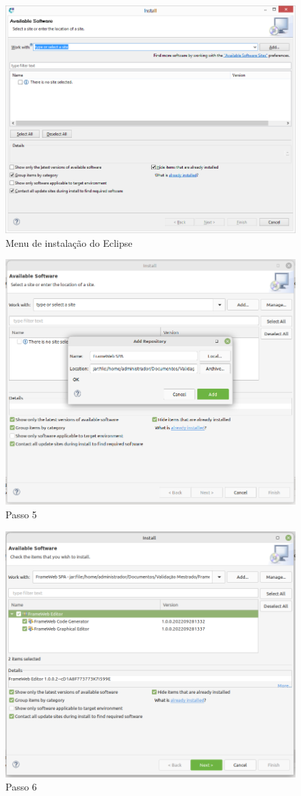 \documentclass[
article,			%
11pt,				%
oneside,			%
a4paper,			%
english,			%
brazil,				%
sumario=tradicional
]{abntex2}
\begin{document}
\begin{figure}
	\centering
	\includegraphics[width=0.7\linewidth]{figuras/Sirius_tuto5_16}
	\caption{Menu de instalação do Eclipse}
	\label{fig:siriustuto516}
\end{figure}

\begin{figure}
	\centering
	\includegraphics[width=0.7\linewidth]{"figuras/Tutorial 2"}
	\caption{Passo 5}
	\label{fig:tutorial-2}
\end{figure}

\begin{figure}
	\centering
	\includegraphics[width=0.7\linewidth]{"figuras/Tutorial 3"}
	\caption{Passo 6}
	\label{fig:tutorial-3}
\end{figure}
\end{document}
